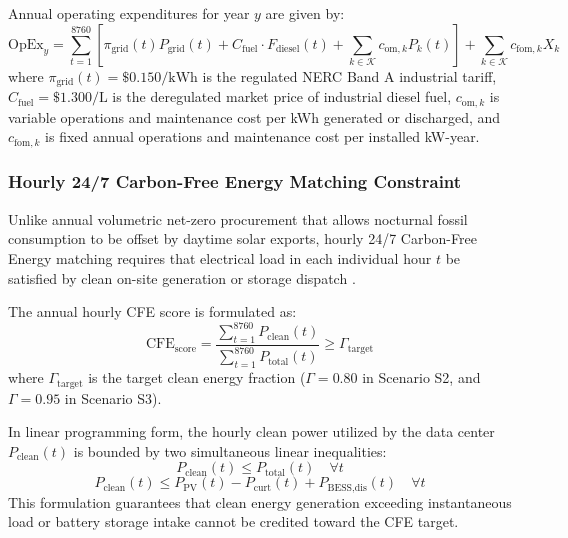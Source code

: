 \documentclass[11pt,a4paper]{article}
\begin{document}
Annual operating expenditures for year $y$ are given by:
\begin{equation}
    \text{OpEx}_y = \sum_{t=1}^{8760} \left[ \pi_{\text{grid}}(t) P_{\text{grid}}(t) + C_{\text{fuel}} \cdot F_{\text{diesel}}(t) + \sum_{k \in \mathcal{K}} c_{\text{om},k} P_k(t) \right] + \sum_{k \in \mathcal{K}} c_{\text{fom},k} X_k
    \label{eq:opex}
\end{equation}
where $\pi_{\text{grid}}(t) = \$0.150/\text{kWh}$ is the regulated NERC Band A industrial tariff, $C_{\text{fuel}} = \$1.300/\text{L}$ is the deregulated market price of industrial diesel fuel, $c_{\text{om},k}$ is variable operations and maintenance cost per kWh generated or discharged, and $c_{\text{fom},k}$ is fixed annual operations and maintenance cost per installed kW-year.

\subsubsection{Hourly 24/7 Carbon-Free Energy Matching Constraint}
Unlike annual volumetric net-zero procurement that allows nocturnal fossil consumption to be offset by daytime solar exports, hourly 24/7 Carbon-Free Energy matching requires that electrical load in each individual hour $t$ be satisfied by clean on-site generation or storage dispatch \cite{Xu2024, Bistline2023}.

The annual hourly CFE score is formulated as:
\begin{equation}
    \text{CFE}_{\text{score}} = \frac{\sum_{t=1}^{8760} P_{\text{clean}}(t)}{\sum_{t=1}^{8760} P_{\text{total}}(t)} \ge \Gamma_{\text{target}}
    \label{eq:cfe_target}
\end{equation}
where $\Gamma_{\text{target}}$ is the target clean energy fraction ($\Gamma = 0.80$ in Scenario S2, and $\Gamma = 0.95$ in Scenario S3).

In linear programming form, the hourly clean power utilized by the data center $P_{\text{clean}}(t)$ is bounded by two simultaneous linear inequalities:
\begin{equation}
    P_{\text{clean}}(t) \le P_{\text{total}}(t) \quad \forall t
    \label{eq:cfe_bound1}
\end{equation}
\begin{equation}
    P_{\text{clean}}(t) \le P_{\text{PV}}(t) - P_{\text{curt}}(t) + P_{\text{BESS,dis}}(t) \quad \forall t
    \label{eq:cfe_bound2}
\end{equation}
This formulation guarantees that clean energy generation exceeding instantaneous load or battery storage intake cannot be credited toward the CFE target.
\end{document}
